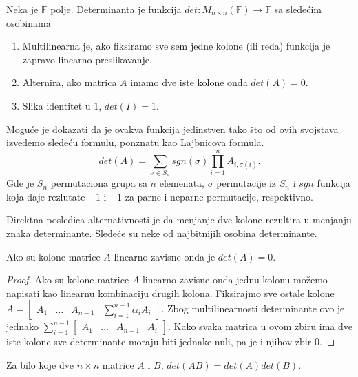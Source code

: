 \documentclass{article}
\begin{document}
\begin{definition}[Determinanta]
  Neka je $\mathbb{F}$ polje.
  Determinanta je funkcija $det : M_{n \times n} (\mathbb{F}) \to \mathbb{F}$ sa sledećim osobinama
  \begin{enumerate}
    \item Multilinearna je, ako fiksiramo sve sem jedne kolone (ili reda) funkcija je zapravo linearno preslikavanje.
    \item Alternira, ako matrica $A$ imamo dve iste kolone onda $det(A) = 0$.
    \item Slika identitet u $1$, $det(I) = 1$.
  \end{enumerate}

  Moguće je dokazati da je ovakva funkcija jedinstven tako što od ovih svojstava izvedemo sledeću formulu, ponznatu kao Lajbnicova formula.
  \[det(A) = \sum_{\sigma \in S_n} sgn(\sigma) \prod_{i = 1}^{n} A_{i, \sigma(i)}.\]
  Gde je $S_n$ permutaciona grupa sa $n$ elemenata, $\sigma$ permutacije iz $S_n$ i $sgn$ funkcija koja daje rezlutate $+1$ i $-1$ za parne i neparne permutacije, respektivno.
\end{definition}

Direktna posledica alternativnosti je da menjanje dve kolone rezultira u menjanju znaka determinante.
Sledeće su neke od najbitnijih osobina determinante.

\begin{theorem}
  Ako su kolone matrice $A$ linearno zavisne onda je $det(A) = 0$.
\end{theorem}

\begin{proof}
  Ako su kolone matrice $A$ linearno zavisne onda jednu kolonu možemo napisati kao linearnu kombinaciju drugih kolona.
  Fiksirajmo sve ostale kolone $A = \begin{bmatrix} A_1 & \ldots & A_{n - 1} & \sum_{i = 1}^{n - 1} \alpha_i A_i \end{bmatrix}$.
  Zbog multilinearnosti determinante ovo je jednako $\sum_{i = 1}^{n - 1} \begin{bmatrix} A_1 & \ldots & A_{n - 1} & A_i \end{bmatrix}$.
  Kako svaka matrica u ovom zbiru ima dve iste kolone sve determinante moraju biti jednake nuli, pa je i njihov zbir 0.
\end{proof}

\begin{theorem}
  Za bilo koje dve $n \times n$ matrice $A$ i $B$, $det(AB) = det(A)det(B)$.
\end{theorem}
\end{document}
